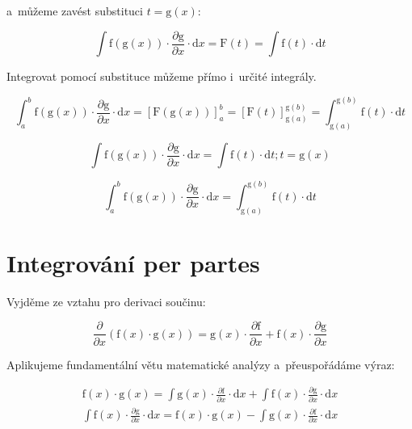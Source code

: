 a~můžeme zavést substituci \(t = \mathrm{g}(x)\): 

\begin{equation}
\int \mathrm{f}(\mathrm{g}(x)) \cdot \frac{\partial \mathrm{g}}{\partial x} \cdot \mathrm{d}x = \mathrm{F}(t) = \int \mathrm{f}(t) \cdot \mathrm{d}t
\end{equation}

Integrovat pomocí substituce můžeme přímo i~určité integrály.

\begin{equation}
\int_a^b \mathrm{f}(\mathrm{g}(x)) \cdot \frac{\partial \mathrm{g}}{\partial x} \cdot \mathrm{d}x = [\mathrm{F}(\mathrm{g}(x))]_a^b = [\mathrm{F}(t)]_{\mathrm{g}(a)}^{\mathrm{g}(b)} = \int_{\mathrm{g}(a)}^{\mathrm{g}(b)} \mathrm{f}(t) \cdot \mathrm{d}t
\end{equation}

\begin{fact}
\begin{equation}
\int \mathrm{f}(\mathrm{g}(x)) \cdot \frac{\partial \mathrm{g}}{\partial x} \cdot \mathrm{d}x = \int \mathrm{f}(t) \cdot \mathrm{d}t; t = \mathrm{g}(x)
\end{equation}

\begin{equation}
\int_a^b \mathrm{f}(\mathrm{g}(x)) \cdot \frac{\partial \mathrm{g}}{\partial x} \cdot \mathrm{d}x = \int_{\mathrm{g}(a)}^{\mathrm{g}(b)} \mathrm{f}(t) \cdot \mathrm{d}t
\end{equation}

\end{fact}

\section{Integrování per partes}

Vyjděme ze vztahu pro derivaci součinu:

\begin{equation}
\frac{\partial}{\partial x} (\mathrm{f}(x) \cdot \mathrm{g}(x)) = \mathrm{g}(x) \cdot \frac{\partial \mathrm{f}}{\partial x} + \mathrm{f}(x) \cdot \frac{\partial \mathrm{g}}{\partial x}
\end{equation}

Aplikujeme fundamentální větu matematické analýzy a~přeuspořádáme výraz:

\begin{equation}
\begin{split}
\mathrm{f}(x) \cdot \mathrm{g}(x) = \int \mathrm{g}(x) \cdot \frac{\partial \mathrm{f}}{\partial x} \cdot \mathrm{d}x + \int \mathrm{f}(x) \cdot \frac{\partial \mathrm{g}}{\partial x} \cdot \mathrm{d}x \\
\int \mathrm{f}(x) \cdot \frac{\partial \mathrm{g}}{\partial x} \cdot \mathrm{d}x = \mathrm{f}(x) \cdot \mathrm{g}(x) - \int \mathrm{g}(x) \cdot \frac{\partial \mathrm{f}}{\partial x} \cdot \mathrm{d}x
\end{split}
\end{equation}

